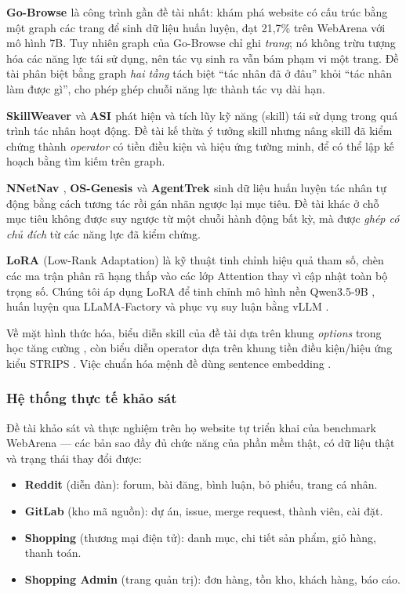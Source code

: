 \documentclass[14pt]{article}
\begin{document}
\textbf{Go-Browse \cite{gandhi2026gobrowse}} là công trình gần đề tài nhất: khám phá website có cấu trúc bằng một graph các trang để sinh dữ liệu huấn luyện, đạt 21,7\% trên WebArena với mô hình 7B. Tuy nhiên graph của Go-Browse chỉ ghi \textit{trang}; nó không trừu tượng hóa các năng lực tái sử dụng, nên tác vụ sinh ra vẫn bám phạm vi một trang. Đề tài phân biệt bằng graph \textit{hai tầng} tách biệt ``tác nhân đã ở đâu'' khỏi ``tác nhân làm được gì'', cho phép ghép chuỗi năng lực thành tác vụ dài hạn.

\textbf{SkillWeaver \cite{zheng2025skillweaver}} và \textbf{ASI \cite{wang2025asi}} phát hiện và tích lũy kỹ năng (skill) tái sử dụng trong quá trình tác nhân hoạt động. Đề tài kế thừa ý tưởng skill nhưng nâng skill đã kiểm chứng thành \textit{operator} có tiền điều kiện và hiệu ứng tường minh, để có thể lập kế hoạch bằng tìm kiếm trên graph.

\textbf{NNetNav \cite{murty2024nnetnav}}, \textbf{OS-Genesis \cite{sun2024osgenesis}} và \textbf{AgentTrek \cite{xu2024agenttrek}} sinh dữ liệu huấn luyện tác nhân tự động bằng cách tương tác rồi gán nhãn ngược lại mục tiêu. Đề tài khác ở chỗ mục tiêu không được suy ngược từ một chuỗi hành động bất kỳ, mà được \textit{ghép có chủ đích} từ các năng lực đã kiểm chứng.

\textbf{LoRA \cite{hu2022lora}} (Low-Rank Adaptation) là kỹ thuật tinh chỉnh hiệu quả tham số, chèn các ma trận phân rã hạng thấp vào các lớp Attention thay vì cập nhật toàn bộ trọng số. Chúng tôi áp dụng LoRA để tinh chỉnh mô hình nền Qwen3.5-9B \cite{yang2025qwen3}, huấn luyện qua LLaMA-Factory \cite{zheng2024llamafactory} và phục vụ suy luận bằng vLLM \cite{kwon2023vllm}.

Về mặt hình thức hóa, biểu diễn skill của đề tài dựa trên khung \textit{options} trong học tăng cường \cite{sutton1999options}, còn biểu diễn operator dựa trên khung tiền điều kiện/hiệu ứng kiểu STRIPS \cite{fikes1971strips}. Việc chuẩn hóa mệnh đề dùng sentence embedding \cite{reimers2019sbert}.

\subsubsection{Hệ thống thực tế khảo sát}

Đề tài khảo sát và thực nghiệm trên họ website tự triển khai của benchmark WebArena --- các bản sao đầy đủ chức năng của phần mềm thật, có dữ liệu thật và trạng thái thay đổi được:

\begin{itemize}[leftmargin=1.5cm, label=\textbullet]
    \item \textbf{Reddit} (diễn đàn): forum, bài đăng, bình luận, bỏ phiếu, trang cá nhân.
    \item \textbf{GitLab} (kho mã nguồn): dự án, issue, merge request, thành viên, cài đặt.
    \item \textbf{Shopping} (thương mại điện tử): danh mục, chi tiết sản phẩm, giỏ hàng, thanh toán.
    \item \textbf{Shopping Admin} (trang quản trị): đơn hàng, tồn kho, khách hàng, báo cáo.
\end{itemize}
\end{document}
